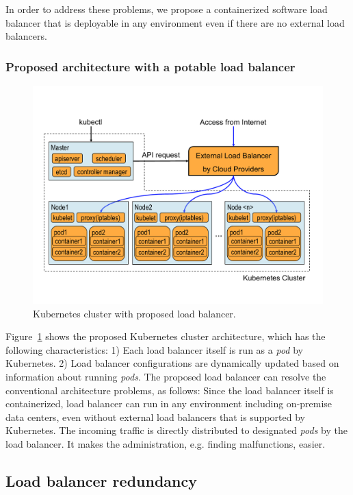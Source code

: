 In order to address these problems, we propose a containerized software load balancer 
that is deployable in any environment even if there are no external load balancers.

\subsubsection{Proposed architecture with a potable load balancer}

\begin{figure}
\includegraphics[width=\columnwidth]{Figs/K8sProposed}
\caption{Kubernetes cluster with proposed load balancer.}
\label{fig:K8sProposed}
\end{figure}

Figure~\ref{fig:K8sProposed} shows the proposed  Kubernetes cluster architecture, 
which has the following characteristics:
1) Each load balancer itself is run as a {\em pod} by Kubernetes. 
2) Load balancer configurations are dynamically updated based on information about running {\em pods}.
The proposed load balancer can resolve the conventional architecture problems, as follows:
Since the load balancer itself is containerized, load balancer can run in any environment including on-premise data centers, 
even without external load balancers that is supported by Kubernetes.
The incoming traffic is directly distributed to designated {\em pods} by the load balancer. 
It makes the administration, e.g. finding malfunctions, easier.

\subsection{Load balancer redundancy}

